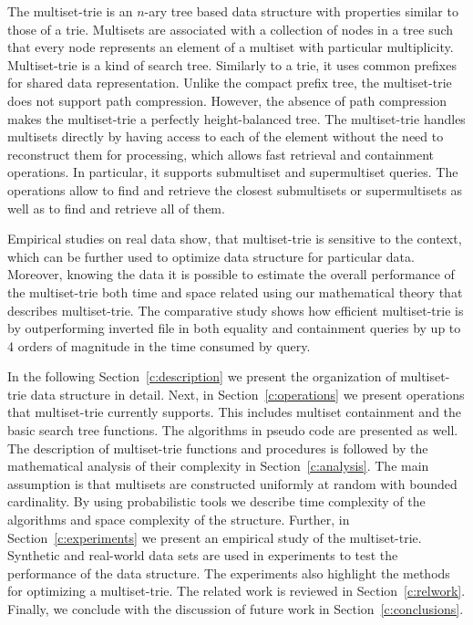 The multiset-trie is an $n$-ary tree based data structure with properties similar to those of a trie. 
Multisets are associated with a collection of nodes in a tree such that every node represents an element 
of a multiset with particular multiplicity. 
%
Multiset-trie is a kind of search tree. Similarly to a trie, it uses common prefixes for shared data representation.
Unlike the compact prefix tree, the multiset-trie does not support path compression. However, the absence of path 
compression makes the multiset-trie a perfectly height-balanced tree.
%
The multiset-trie handles multisets directly by having access to each of the element 
without the need to reconstruct them for processing, which allows fast retrieval and 
containment operations. In particular, it supports submultiset and supermultiset queries.
The operations allow to find and retrieve the closest submultisets or supermultisets 
as well as to find and retrieve all of them.


Empirical studies on real data show, that multiset-trie is sensitive to the context, which can 
be further used to optimize data structure for particular data. Moreover, knowing the data 
it is possible to estimate the overall performance of the multiset-trie both time and space 
related using our mathematical theory that describes multiset-trie.
%
The comparative study shows how efficient multiset-trie is by outperforming inverted file in 
both equality and containment queries by up to 4 orders of magnitude in the time consumed by 
query. 


%
In the following Section~\ref{c:description} we present the organization of 
multiset-trie data structure in detail.
%
Next, in Section~\ref{c:operations} we present operations that multiset-trie currently 
supports. This includes multiset containment and the basic search tree functions. 
The algorithms in pseudo code are presented as well. 
%
The description of multiset-trie functions and procedures is followed by the 
mathematical analysis of their complexity in Section~\ref{c:analysis}. 
The main assumption is that multisets are constructed uniformly at random 
with bounded cardinality. By using probabilistic tools we describe time complexity of 
the algorithms and space complexity of the structure.
%
Further, in Section~\ref{c:experiments} we present an empirical study of the 
multiset-trie. Synthetic and real-world data sets are used in experiments to test the performance 
of the data structure. The experiments also highlight the methods for optimizing a multiset-trie.
%
The related work is reviewed in Section~\ref{c:relwork}. 
%
Finally, we conclude with the discussion of future work in Section~\ref{c:conclusions}.
%
